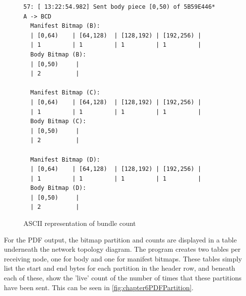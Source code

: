 \begin{figure}
    \begin{centering}
\begin{lstlisting}[basicstyle=\small, frame=single, breaklines]
57: [ 13:22:54.982] Sent body piece [0,50) of 5B59E446*
A -> BCD
  Manifest Bitmap (B):
  | [0,64)    | [64,128)  | [128,192) | [192,256) |
  | 1         | 1         | 1         | 1         |
  Body Bitmap (B):
  | [0,50)     |
  | 2          |
  
  Manifest Bitmap (C):
  | [0,64)    | [64,128)  | [128,192) | [192,256) |
  | 1         | 1         | 1         | 1         |
  Body Bitmap (C):
  | [0,50)     |
  | 2          |
  
  Manifest Bitmap (D):
  | [0,64)    | [64,128)  | [128,192) | [192,256) |
  | 1         | 1         | 1         | 1         |
  Body Bitmap (D):
  | [0,50)     |
  | 2          |
\end{lstlisting}
        \caption{ASCII representation of bundle count}
        \label{fig:chapter6ASCIIPartition}
    \end{centering}
\end{figure}


For the PDF output, the bitmap partition and counts are displayed in a table underneath the network topology diagram.
The program creates two tables per receiving node, one for body and one for manifest bitmaps.
These tables simply list the start and end bytes for each partition in the header row, and beneath each of these, show the 'live' count of the number of times that these partitions have been sent.
This can be seen in \figurename{ \ref{fig:chapter6PDFPartition}}.

